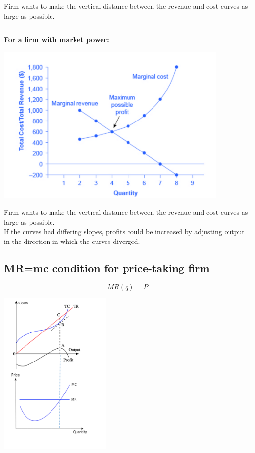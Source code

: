 \documentclass[]{article}
\begin{document}
Firm wants to make the vertical distance between the revenue and cost curves as large as possible.

\begin{center}\rule{0.5\linewidth}{\linethickness}\end{center}

\textbf{For a firm with market power:}

\includegraphics[width=4.5in]{picsfigs/monopmcmr.png}

Firm wants to make the vertical distance between the revenue and cost curves as large as possible.\\
If the curves had differing slopes, profits could be increased by adjusting output in the direction in which the curves diverged.

\hypertarget{mrmc-condition-for-price-taking-firm}{%
\subsection{MR=mc condition for price-taking firm}\label{mrmc-condition-for-price-taking-firm}}

\[MR(q) = P\]

\includegraphics[width=5.5cm]{picsfigs/mcmr_tc_tr.png}
\end{document}
